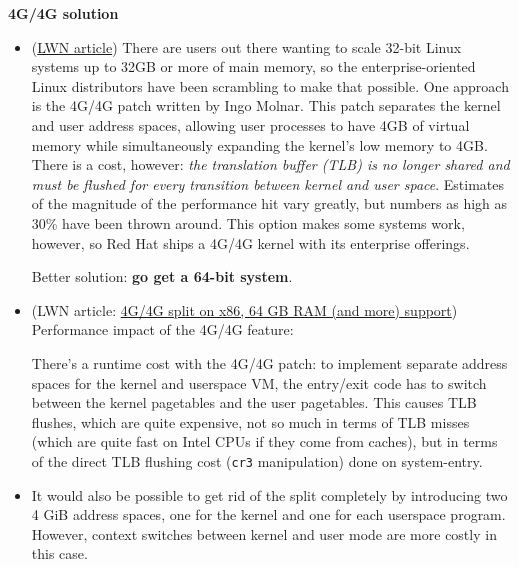 \textbf{4G/4G solution}
\begin{itemize}
\item (\href{http://lwn.net/Articles/75174/}{LWN article}) There are users out there
  wanting to scale 32-bit Linux systems up to 32GB or more of main memory, so the
  enterprise-oriented Linux distributors have been scrambling to make that possible. One
  approach is the 4G/4G patch written by Ingo Molnar. This patch separates the kernel and
  user address spaces, allowing user processes to have 4GB of virtual memory while
  simultaneously expanding the kernel's low memory to 4GB. There is a cost, however:
  \emph{the translation buffer (TLB) is no longer shared and must be flushed for every
    transition between kernel and user space}. Estimates of the magnitude of the
  performance hit vary greatly, but numbers as high as 30\% have been thrown around. This
  option makes some systems work, however, so Red Hat ships a 4G/4G kernel with its
  enterprise offerings.

  Better solution: \textbf{go get a 64-bit system}.
\item (LWN article: \href{http://lwn.net/Articles/39283/}{4G/4G split on x86, 64 GB RAM
    (and more) support}) Performance impact of the 4G/4G feature:
  
  There's a runtime cost with the 4G/4G patch: to implement separate address spaces for
  the kernel and userspace VM, the entry/exit code has to switch between the kernel
  pagetables and the user pagetables. This causes TLB flushes, which are quite expensive,
  not so much in terms of TLB misses (which are quite fast on Intel CPUs if they come from
  caches), but in terms of the direct TLB flushing cost (\texttt{cr3} manipulation) done on
  system-entry. 
\item It would also be possible to get rid of the split completely by introducing two 4
  GiB address spaces, one for the kernel and one for each userspace program. However,
  context switches between kernel and user mode are more costly in this
  case. 
\end{itemize}


